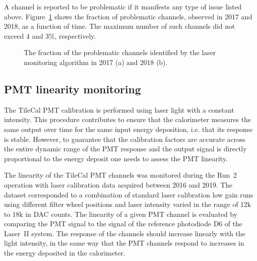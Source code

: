 A channel is reported to be problematic if it manifests any type of issue listed above. Figure~\ref{fig:overall} shows the fraction of problematic channels, observed in 2017 and 2018, as a function of time. The maximum number of such channels did not exceed 4 and 3\%, respectively.

\begin{figure}[h!]
  \centering
  \quad
    \caption{\label{fig:overall} The fraction of the problematic channels identified by the  laser monitoring algorithm in 2017 (a) and 2018 (b).
    } 
\end{figure}
\FloatBarrier



\subsection{PMT linearity monitoring}

The TileCal PMT calibration is performed using laser light with a constant intensity. This procedure contributes to ensure that the calorimeter measures the same output over time for the same input energy deposition, i.e. that its response is stable. However, to guarantee that the calibration factors are accurate across the entire dynamic range of the PMT response and the output signal is directly proportional to the energy deposit one needs to assess the PMT linearity.

The linearity of the TileCal PMT channels was monitored during the Run~2 operation with laser calibration data acquired between 2016 and 2019. The dataset corresponded to a combination of standard laser calibration low gain runs using different filter wheel positions and laser intensity varied in the range of 12k to 18k in DAC counts. The linearity of a given PMT channel is evaluated by comparing the PMT signal to the signal of the reference photodiode D6 of the Laser~II system. The response of the channels should increase linearly with the light intensity, in the same way that the PMT channels respond to increases in the energy deposited in the calorimeter. 

